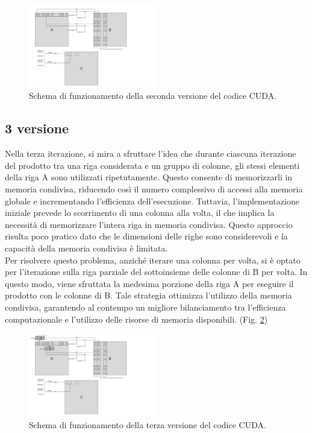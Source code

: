 \documentclass[conference]{IEEEtran}
\begin{document}
\begin{figure}
    \centering
    \includegraphics[width=0.5\textwidth]{resources/cuda_scheme_v2.png}
    \caption{Schema di funzionamento della seconda versione del codice CUDA.}
    \label{fig:cuda_scheme_v2}
\end{figure}

\subsection{3 versione}
Nella terza iterazione, si mira a sfruttare l'idea che durante ciascuna iterazione del prodotto tra una riga considerata e un gruppo di colonne, gli stessi elementi della riga A sono utilizzati ripetutamente. Questo consente di memorizzarli in memoria condivisa, riducendo così il numero complessivo di accessi alla memoria globale e incrementando l'efficienza dell'esecuzione. Tuttavia, l'implementazione iniziale prevede lo scorrimento di una colonna alla volta, il che implica la necessità di memorizzare l'intera riga in memoria condivisa. Questo approccio risulta poco pratico dato che le dimensioni delle righe sono considerevoli e la capacità della memoria condivisa è limitata. \\ Per risolvere questo problema, anziché iterare una colonna per volta, si è optato per l'iterazione sulla riga parziale del sottoinsieme delle colonne di B per volta. In questo modo, viene sfruttata la medesima porzione della riga A per eseguire il prodotto con le colonne di B. Tale strategia ottimizza l'utilizzo della memoria condivisa, garantendo al contempo un migliore bilanciamento tra l'efficienza computazionale e l'utilizzo delle risorse di memoria disponibili. (Fig. \ref{fig:cuda_scheme_v3})

\begin{figure}
    \centering
    \includegraphics[width=0.5\textwidth]{resources/cuda_scheme_v3.png}
    \caption{Schema di funzionamento della terza versione del codice CUDA.}
    \label{fig:cuda_scheme_v3}
\end{figure}
\end{document}

